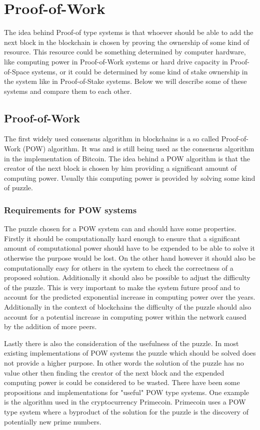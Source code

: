 \section{Proof-of-Work}

The idea behind Proof-of type systems is that whoever should be able to add the next block in the blockchain is chosen by proving the ownership of some kind of resource. This resource could be
something determined by computer hardware, like computing power in Proof-of-Work systems or hard drive capacity in Proof-of-Space systems, or it could be determined by some kind of stake ownership
in the system like in Proof-of-Stake systems. Below we will describe some of these systems and compare them to each other.

\subsection{Proof-of-Work}

The first widely used consensus algorithm in blockchains is a so called Proof-of-Work (POW) algorithm. It was and is still being used as the consensus algorithm in the implementation of Bitcoin.\cite{url:bitcoin}
The idea behind a POW algorithm is that the creator of the next block is chosen by him providing a significant amount of computing power. Usually this computing power is provided by solving some
kind of puzzle. 

\subsubsection{Requirements for POW systems}

The puzzle chosen for a POW system can and should have some properties. Firstly it should be computationally hard enough to ensure that a significant amount of computational power should have 
to be expended to be able to solve it otherwise the purpose would be lost. On the other hand however it should also be computationally easy for others in the system to check the correctness 
of a proposed solution. Additionally it should also be possible to adjust the difficulty of the puzzle. This is very important to make the system future proof and to account for the predicted
exponential increase in computing power over the years.\cite{url:moore_law} Additionally in the context of blockchains the difficulty of the puzzle should also account for a potential
increase in computing power within the network caused by the addition of more peers.\par
Lastly there is also the consideration of the usefulness of the puzzle. In most existing implementations
of POW systems the puzzle which should be solved does not provide a higher purpose. In other words the solution of the puzzle has no value other then finding the creator of the next block
and the expended computing power is could be considered to be wasted.\cite{url:pow_useless} There have been some propositions and implementations for "useful" POW type systems. One example is
the algorithm used in the cryptocurrency Primecoin. Primecoin uses a POW type system where a byproduct of the solution for the puzzle is the discovery of potentially new prime numbers.\cite{url:primecoin}

